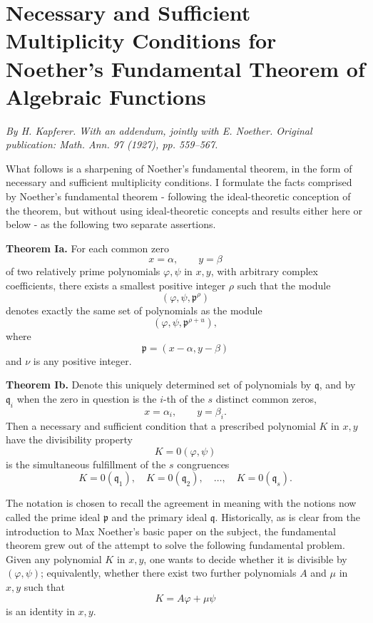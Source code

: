 \documentclass[12pt]{article}
\begin{document}
\section{Necessary and Sufficient Multiplicity Conditions for Noether's Fundamental Theorem of Algebraic Functions}

\textit{By H. Kapferer. With an addendum, jointly with E. Noether. Original publication: Math. Ann. 97 (1927), pp. 559--567.}

What follows is a sharpening of Noether's fundamental theorem, in the form of necessary and sufficient multiplicity conditions. I formulate the facts comprised by Noether's fundamental theorem - following the ideal-theoretic conception of the theorem, but without using ideal-theoretic concepts and results either here or below - as the following two separate assertions.

\textbf{Theorem Ia.} For each common zero
\[
  x=\alpha,
  \qquad
  y=\beta
\]
of two relatively prime polynomials \(\varphi,\psi\) in \(x,y\), with arbitrary complex coefficients, there exists a smallest positive integer \(\rho\) such that the module
\[
  (\varphi,\psi,\mathfrak p^{\rho})
\]
denotes exactly the same set of polynomials as the module
\[
  (\varphi,\psi,\mathfrak p^{\rho+
u}),
\]
where
\[
  \mathfrak p=(x-\alpha,y-\beta)
\]
and \(\nu\) is any positive integer.

\textbf{Theorem Ib.} Denote this uniquely determined set of polynomials by \(\mathfrak q\), and by \(\mathfrak q_i\) when the zero in question is the \(i\)-th of the \(s\) distinct common zeros,
\[
  x=\alpha_i,
  \qquad
  y=\beta_i.
\]
Then a necessary and sufficient condition that a prescribed polynomial \(K\) in \(x,y\) have the divisibility property
\[
  K=0(\varphi,\psi)
\]
is the simultaneous fulfillment of the \(s\) congruences
\[
  K=0(\mathfrak q_1),\quad
  K=0(\mathfrak q_2),\quad \ldots,\quad
  K=0(\mathfrak q_s).
\]

The notation is chosen to recall the agreement in meaning with the notions now called the prime ideal \(\mathfrak p\) and the primary ideal \(\mathfrak q\). Historically, as is clear from the introduction to Max Noether's basic paper on the subject, the fundamental theorem grew out of the attempt to solve the following fundamental problem. Given any polynomial \(K\) in \(x,y\), one wants to decide whether it is divisible by \((\varphi,\psi)\); equivalently, whether there exist two further polynomials \(A\) and \(\mu\) in \(x,y\) such that
\[
  K=A\varphi+\mu\psi
\]
is an identity in \(x,y\).
\end{document}
